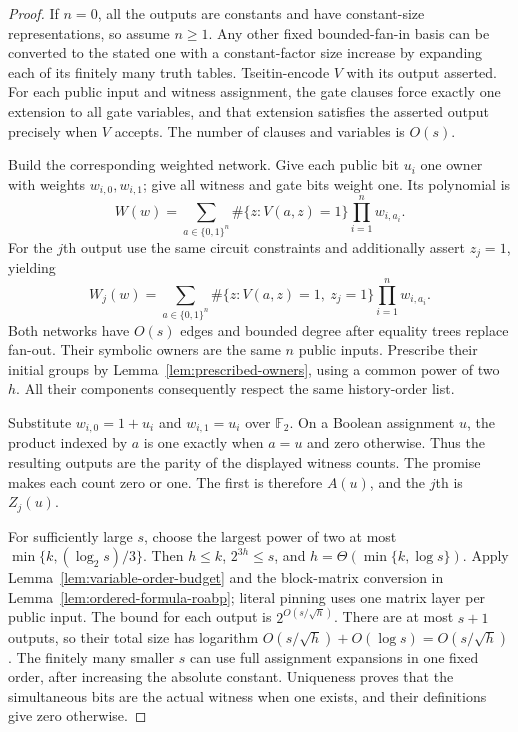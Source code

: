 \documentclass[11pt]{article}
\theoremstyle{definition}
\theoremstyle{remark}
\begin{document}
\begin{proof}
If $n=0$, all the outputs are constants and have constant-size
representations, so assume $n\ge1$. Any other fixed bounded-fan-in
basis can be converted to the stated one with a constant-factor
size increase by expanding each of its finitely many truth tables.
Tseitin-encode $V$ with its output asserted. For each public input
and witness assignment, the gate clauses force exactly one extension
to all gate variables, and that extension satisfies the asserted
output precisely when $V$ accepts. The number of clauses and
variables is $O(s)$.

Build the corresponding weighted network. Give each public bit
$u_i$ one owner with weights $w_{i,0},w_{i,1}$; give all witness
and gate bits weight one. Its polynomial is
\[
 W(w)=\sum_{a\in\{0,1\}^n}
      \#\{z:V(a,z)=1\}\prod_{i=1}^n w_{i,a_i}.
\]
For the $j$th output use the same circuit constraints and additionally
assert $z_j=1$, yielding
\[
 W_j(w)=\sum_{a\in\{0,1\}^n}
      \#\{z:V(a,z)=1,\ z_j=1\}\prod_{i=1}^n w_{i,a_i}.
\]
Both networks have $O(s)$ edges and bounded degree after equality
trees replace fan-out. Their symbolic owners are the same $n$
public inputs. Prescribe their initial groups by
Lemma~\ref{lem:prescribed-owners}, using a common power of two $h$.
All their components consequently respect the same history-order list.

Substitute $w_{i,0}=1+u_i$ and $w_{i,1}=u_i$ over $\mathbb F_2$.
On a Boolean assignment $u$, the product indexed by $a$ is one
exactly when $a=u$ and zero otherwise. Thus the resulting outputs
are the parity of the displayed witness counts. The promise makes
each count zero or one. The first is therefore $A(u)$, and the
$j$th is $Z_j(u)$.

For sufficiently large $s$, choose the largest power of two at most
$\min\{k,(\log_2s)/3\}$. Then $h\le k$, $2^{3h}\le s$, and
$h=\Theta(\min\{k,\log s\})$. Apply
Lemma~\ref{lem:variable-order-budget} and the block-matrix conversion
in Lemma~\ref{lem:ordered-formula-roabp}; literal pinning uses one
matrix layer per public input. The bound for each output is
$2^{O(s/\sqrt h)}$. There are at most $s+1$ outputs, so their total
size has logarithm $O(s/\sqrt h)+O(\log s)=O(s/\sqrt h)$.
The finitely many smaller $s$ can use full assignment expansions
in one fixed order, after increasing the absolute constant.
Uniqueness proves that the simultaneous bits are the actual witness
when one exists, and their definitions give zero otherwise.
\end{proof}
\end{document}
